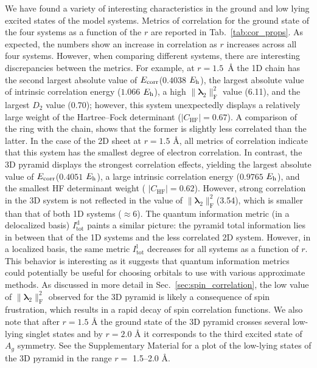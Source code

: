 \documentclass[aip,jcp,amsmath,amssymb, preprint]{revtex4-1}
\newcommand*{\Eh}{$E_{\rm h}$\xspace}
\newcommand*{\Ecorr}{$E_{\rm{corr}}$\xspace}
\newcommand*{\RCMnorm}{$\norm{\pmb{\lambda}_{2}}^{2}_\mathrm{F}$\xspace}
\providecommand{\norm}[1]{\lVert#1\rVert}
\begin{document}
We have found a variety of interesting characteristics in the ground and low lying excited states of the  model systems.
Metrics of correlation for the ground state of the four  systems as a function of the $r$ are reported in Tab.~\ref{tab:cor_props}. 
As expected, the numbers show an increase in correlation as $r$ increases across all four systems. 
However, when comparing different systems, there are interesting discrepancies between the metrics. 
For example, at $r=1.5$~{\AA} the 1D  chain has the second largest absolute value of \Ecorr  ($0.4038$ \Eh), the largest absolute value of intrinsic correlation energy ($1.066$ \Eh), a high \RCMnorm value (6.11), and the largest $D_2$ value (0.70); however, this system unexpectedly displays a relatively large weight of the Hartree--Fock determinant  ($|C_\mathrm{HF}| = 0.67$).
A comparison of the ring with the chain, shows that the former is slightly less correlated than the latter.
In the case of the 2D sheet at $r = 1.5$ {\AA}, all metrics of correlation indicate that this system has the smallest degree of electron correlation.
In contrast, the 3D pyramid displays the strongest correlation effects, yielding the largest absolute value of \Ecorr  ($0.4051$ \Eh), a large intrinsic correlation energy ($0.9765$ \Eh), and the smallest HF determinant  weight ( $|C_\mathrm{HF}| = 0.62$).
However, strong correlation in the 3D system is not reflected in the value of \RCMnorm (3.54), which is smaller than that of both 1D systems ($\approx 6$).
The quantum information metric (in a delocalized basis) $I_{\text{tot}}^\mathrm{d}$ paints a similar picture: the pyramid total information lies in between that of the 1D systems and the less correlated 2D system. 
However, in a localized basis, the same metric $I_{\text{tot}}^\mathrm{l}$ decreases for all systems as a function of $r$.
This behavior is interesting as it suggests that quantum information metrics could potentially be useful for choosing orbitals to use with various approximate methods.
As discussed in more detail in Sec.~\ref{sec:spin_correlation}, the low value of \RCMnorm observed for the 3D pyramid is likely a consequence of spin frustration, which results in a rapid decay of spin correlation functions.
We also note that after $r = 1.5$ {\AA} the ground state of the 3D pyramid crosses several low-lying singlet states and by $r = 2.0$ {\AA} it corresponds to the third excited state of $A_g$ symmetry.
See the Supplementary Material for a plot of the low-lying states of the 3D pyramid in the range $r = $ 1.5--2.0 {\AA}.
\end{document}
